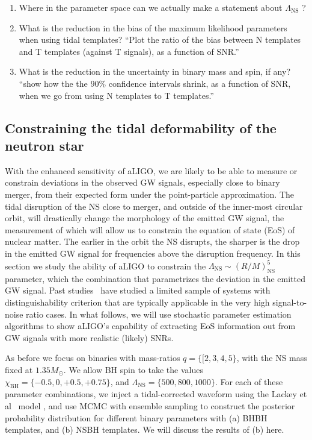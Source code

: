 \documentclass[aps,prd,amsmath,floats,floatfix, twocolumn,
superscriptaddress,nofootinbib,showpacs]{revtex4-1}
\newcommand{\lambdans}{\Lambda_\mathrm{NS}}
\newcommand{\chibh}{\chi_\mathrm{BH}}
\begin{document}
\begin{enumerate}
\item Where in the parameter space can we actually make a statement about 
$\Lambda_\mathrm{NS}$ ?
\item What is the reduction in the bias of the maximum likelihood parameters
when using tidal templates?\newline
``Plot the ratio of the bias between N templates and T templates (against T
signals), as a function of SNR.''
\item What is the reduction in the uncertainty in binary mass and spin, if
any?\newline
``show how the the $90\%$ confidence intervals shrink, as a function of SNR, 
when we go from using N templates to T templates.''
\end{enumerate}


\subsection{Constraining the tidal deformability of the neutron star}\label{s2:measuring_lambda}

With the enhanced sensitivity of aLIGO, we are likely to be able to measure or
constrain deviations in the observed GW signals, especially close to binary
merger, from their expected form under the point-particle approximation.
The tidal disruption of the NS close to merger, and outside of the 
inner-most circular orbit, will drastically change the morphology of the emitted
GW signal, the measurement of which will allow us to constrain the equation 
of state (EoS) of nuclear matter.
The earlier in the orbit the NS disrupts, the sharper is the drop in the emitted
GW signal for frequencies above the disruption frequency. In this section we
study the ability of aLIGO to constrain the 
$\lambdans\sim \left(R/M\right)_\mathrm{NS}^5$ parameter, which
the combination that parametrizes the deviation in the emitted GW signal.
Past studies~\cite{}
have studied a limited sample of systems with distinguishability criterion that
are typically applicable in the very high signal-to-noise ratio cases. 
In what follows, we will use stochastic parameter estimation algorithms to show
aLIGO's capability of extracting EoS information out from GW signals with 
more realistic (likely) SNRs.

As before we focus on binaries with mass-ratios $q=\{[2,3,4,5\}$, with the NS mass
fixed at $1.35M_\odot$. We allow BH spin to take the values 
$\chibh=\{-0.5,0,+0.5,+0.75\}$, and $\lambdans=\{500, 800, 1000\}$. For each of these
parameter combinations, we inject a tidal-corrected waveform using the 
Lackey et al~\cite{} model , and use MCMC with ensemble sampling to construct the 
posterior probability distribution for different binary parameters with (a) BHBH
templates, and (b) NSBH templates. We will discuss the results of (b) here.
\end{document}
